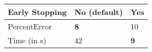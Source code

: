 \begin{table}[h!]
\centering
\begin{tabular}{ |p{2cm}||p{1.5cm}|p{0.75cm}|  }
    \hline
    Early Stopping& No (default) & \textbf{Yes} \\
    \hline \hline
    PercentError & \textbf{8} & 10\\
    \hline
    Time (in s) & 42 & \textbf{9}\\
    \hline
\end{tabular}
\caption{}
\label{early_stopping_performance}
\end{table}
